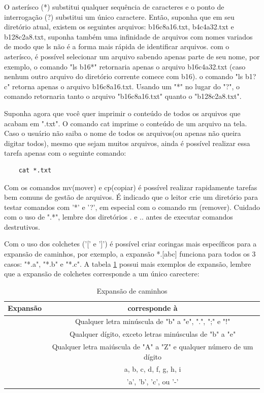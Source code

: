 	O asterísco (*) substitui qualquer sequência de caracteres e o ponto de interrogação (?) substitui um único caractere. Então, suponha que em seu diretório atual, existem os seguintes arquivos: b16c8a16.txt, b4c4a32.txt e b128c2a8.txt, suponha também uma infinidade de arquivos com nomes variados de modo que ls não é a forma mais rápida de identificar arquivos. com o asterísco, é possível selecionar um arquivo sabendo apenas parte de seu nome, por exemplo, o comando "ls b16*" retornaria apenas o arquivo b16c4a32.txt (caso nenhum outro arquivo do diretório corrente comece com b16). o comando "ls b1?c" retorna apenas o arquivo b16c8a16.txt. Usando um "*" no lugar do "?", o comando retornaria tanto o arquivo "b16c8a16.txt" quanto o "b128c2a8.txt".
	
	Suponha agora que você quer imprimir o conteúdo de todos os arquivos que acabam em ".txt". O comando cat imprime o conteúdo de um arquivo na tela. Caso o usuário não saiba o nome de todos os arquivos(ou apenas não queira digitar todos), mesmo que sejam muitos arquivos, ainda é possível realizar essa tarefa apenas com o seguinte comando:
	\begin{lstlisting}
	cat *.txt
	\end{lstlisting}
	Com os comandos mv(mover) e cp(copiar) é possível realizar rapidamente tarefas bem comuns de gestão de arquivos. É indicado que o leitor crie um diretório para testar comandos com '*' e '?', em especial com o comando rm (remover). Cuidado com o uso de ".*", lembre dos diretórios . e .. antes de executar comandos destrutivos.
	
	Com o uso dos colchetes ('[' e ']') é possível criar coringas mais específicos para a expansão de caminhos, por exemplo, a expansão *.[abc] funciona para todos os 3 casos: "*.a", "*.b" e "*.c". A tabela \ref{table:2} possui mais exemplos de expansão, lembre que a expansão de colchetes corresponde a um único carectere:
	\begin{table}[!ht]
		\centering
		\begin{tabular}{ | c | c | } 
			\hline
			\bfseries Expansão & \bfseries corresponde à \\
			\hline
			[b-e.;!] & Qualquer letra minúscula de "b" a "e", ".", ";" e "!" \\
			\hline
			[!b-e] & Qualquer dígito, exceto letras minúsculas de "b" a "e" \\
			\hline
			[A-Z0-9] & Qualquer letra maiúscula de "A" a "Z" e qualquer número de um dígito \\
			\hline
			[a-df-i] & a, b, c, d, f, g, h, i \\
			\hline
			[abc-] & 'a', 'b', 'c', ou '-' \\
			\hline
		\end{tabular}
		\caption{Expansão de caminhos}
		\label{table:2}
	\end{table}
	
